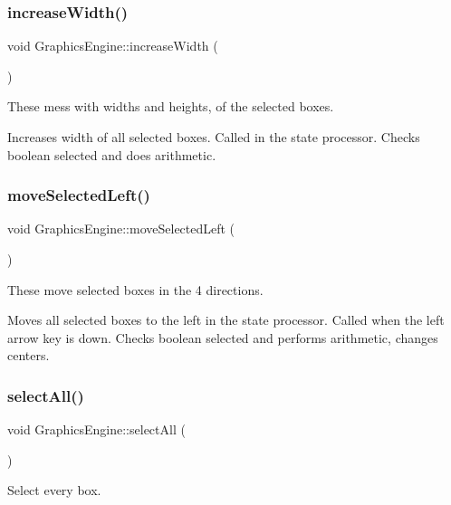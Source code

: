 \subsubsection{\texorpdfstring{increase\+Width()}{increaseWidth()}}
{\footnotesize\ttfamily void Graphics\+Engine\+::increase\+Width (\begin{DoxyParamCaption}{ }\end{DoxyParamCaption})}



These mess with widths and heights, of the selected boxes. 

Increases width of all selected boxes. Called in the state processor. Checks boolean selected and does arithmetic. \mbox{\label{class_graphics_engine_a7f09e50b78a6957ce0bcc2442ba49e06}} 
\subsubsection{\texorpdfstring{move\+Selected\+Left()}{moveSelectedLeft()}}
{\footnotesize\ttfamily void Graphics\+Engine\+::move\+Selected\+Left (\begin{DoxyParamCaption}{ }\end{DoxyParamCaption})}



These move selected boxes in the 4 directions. 

Moves all selected boxes to the left in the state processor. Called when the left arrow key is down. Checks boolean selected and performs arithmetic, changes centers. \mbox{\label{class_graphics_engine_a926e151acd90fc95722d740c4cd02995}} 
\subsubsection{\texorpdfstring{select\+All()}{selectAll()}}
{\footnotesize\ttfamily void Graphics\+Engine\+::select\+All (\begin{DoxyParamCaption}{ }\end{DoxyParamCaption})}



Select every box. 


